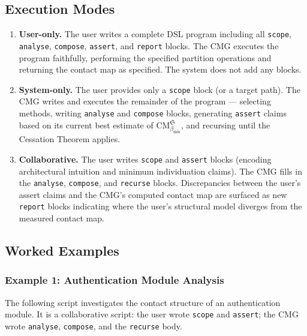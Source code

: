 \documentclass[12pt,a4paper,twocolumn]{article}
\theoremstyle{plain}
\theoremstyle{definition}
\theoremstyle{remark}
\newcommand{\CM}{\mathrm{CM}}
\newcommand{\bmin}{\beta_{\min}}
\newcommand{\CMbmin}{\CM_{\bmin}}
\begin{document}
\subsection{Execution Modes}

\begin{enumerate}[label=\textbf{Mode \arabic*.}, leftmargin=*]
\item \textbf{User-only.}  The user writes a complete DSL program including
  all \texttt{scope}, \texttt{analyse}, \texttt{compose}, \texttt{assert},
  and \texttt{report} blocks.  The CMG executes the program faithfully,
  performing the specified partition operations and returning the contact map
  as specified.  The system does not add any blocks.

\item \textbf{System-only.}  The user provides only a \texttt{scope} block
  (or a target path).  The CMG writes and executes the remainder of the
  program --- selecting methods, writing \texttt{analyse} and \texttt{compose}
  blocks, generating \texttt{assert} claims based on its current best estimate
  of $\CMbmin^\mathfrak{S}$, and recursing until the Cessation Theorem applies.

\item \textbf{Collaborative.}  The user writes \texttt{scope} and
  \texttt{assert} blocks (encoding architectural intuition and minimum
  individuation claims).  The CMG fills in the \texttt{analyse}, \texttt{compose},
  and \texttt{recurse} blocks.  Discrepancies between the user's assert claims
  and the CMG's computed contact map are surfaced as new \texttt{report} blocks
  indicating where the user's structural model diverges from the measured
  contact map.
\end{enumerate}

\subsection{Worked Examples}

\subsubsection{Example 1: Authentication Module Analysis}

The following script investigates the contact structure of an authentication
module.  It is a collaborative script: the user wrote \texttt{scope} and
\texttt{assert}; the CMG wrote \texttt{analyse}, \texttt{compose}, and the
\texttt{recurse} body.
\end{document}
